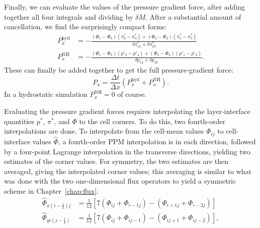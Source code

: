 \documentclass[10pt,letterpaper,margin=1in]{memoir}
\newcommand{\half}{\frac{1}{2}}
\begin{document}
Finally, we can evaluate the values of the pressure gradient force, after adding together all four integrals and dividing by $\delta M$. After a substantial amount of cancellation, we find the surprisingly compact forms:
\begin{equation}
  \begin{split}
    {P_x^{\mathrm{hyd}}} & = - \frac{  \left ( \Phi_1 - \Phi_3 \right ) \left ( \pi^*_2 - \pi^*_4 \right )  + \left ( \Phi_4 - \Phi_2 \right ) \left ( \pi^*_1 - \pi^*_3 \right )}{\delta \pi^*_{14} + \delta \pi^*_{23} } \\
    {P_x^\mathrm{NH}} & = - \frac{ \left ( \Phi_1 - \Phi_3 \right ) \left ( p'_2 - p'_4 \right )  + \left ( \Phi_4 - \Phi_2 \right ) \left ( p'_1 - p'_3 \right ) }{\delta p_{14} + \delta p_{23}} .
  \end{split}
\end{equation}
These can finally be added together to get the full pressure-gradient force:
\begin{equation}
{P_x} = \frac{\Delta t}{\Delta x} \left ( {P_x^\mathrm{hyd}} + {P_x^\mathrm{NH}}  \right ).
\end{equation}
In a hydrostatic simulation ${P_x^\mathrm{NH}} = 0$ of course.

Evaluating the pressure gradient forces requires interpolating the layer-interface quantities $p^*$, $\pi^*$, and $\Phi$ to the cell corners. To do this, two fourth-order interpolations are done. To interpolate from the cell-mean values $\Phi_{ij}$ to cell-interface values $\widehat{\Phi}$, a fourth-order PPM interpolation is in each direction, followed by a four-point Lagrange interpolation in the transverse directions, yielding two estimates of the corner values. For symmetry, the two estimates are then averaged, giving the interpolated corner values; this averaging is similar to what was done with the two one-dimensional flux operators to yield a symmetric scheme in Chapter~\ref{chap:flux}.
\begin{equation}
\begin{split}
\widehat{\Phi}_{x(i-\half)j} &= \frac{1}{12} \left [  7 \left ( \Phi_{ij} + \Phi_{i-1j} \right ) - \left ( \Phi_{i+1j} + \Phi_{i-2j} \right ) \right ]  \\
\widehat{\Phi}_{yi(j-\half)} &=  \frac{1}{12} \left [  7 \left ( \Phi_{ij} + \Phi_{ij-1} \right ) - \left ( \Phi_{ij+1} + \Phi_{ij-2} \right ) \right ],
\end{split}
\end{equation}

\end{document}
